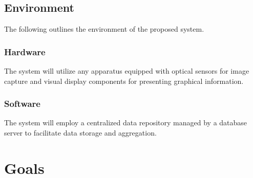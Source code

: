 \documentclass{article}
\begin{document}
\subsection{Environment}
The following outlines the environment of the proposed system.
\subsubsection{Hardware} 
The system will utilize any apparatus equipped with optical sensors for image capture and visual display components for presenting graphical information.
\subsubsection{Software}
The system will employ a centralized data repository managed by a database server to facilitate data storage and aggregation.

\section{Goals}
\end{document}

